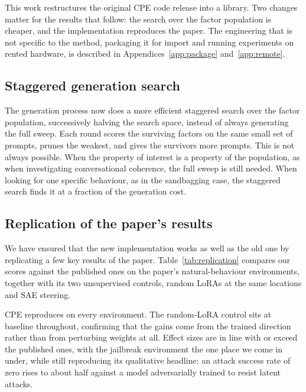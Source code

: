 This work restructures the original CPE code release \citep{mack2026} into a library.
Two changes matter for the results that follow: the search over the factor population is cheaper, and the implementation reproduces the paper.
The engineering that is not specific to the method, packaging it for import and running experiments on rented hardware, is described in Appendices~\ref{app:package} and~\ref{app:remote}.

\subsection{Staggered generation search}

The generation process now does a more efficient staggered search over the factor population, successively halving the search space, instead of always generating the full sweep.
Each round scores the surviving factors on the same small set of prompts, prunes the weakest, and gives the survivors more prompts.
This is not always possible.
When the property of interest is a property of the population, as when investigating conversational coherence, the full sweep is still needed.
When looking for one specific behaviour, as in the sandbagging case, the staggered search finds it at a fraction of the generation cost.

\subsection{Replication of the paper's results}

We have ensured that the new implementation works as well as the old one by replicating a few key results of the paper.
Table~\ref{tab:replication} compares our scores against the published ones on the paper's natural-behaviour environments, together with its two unsupervised controls, random LoRAs at the same locations and SAE steering.

\begin{table}[htbp]
  \centering
  \small
  
  \caption{%
    Replication of the CPE paper's Table~1.
    Each cell gives our score with the published value in parentheses.
    Scores are the selected top-1 factor's held-out test score; base is the same run's no-adapter baseline.
    Countdown and sycophancy are accuracies, jailbreak is attack success rate.%
  }
  \label{tab:replication}
\end{table}

CPE reproduces on every environment.
The random-LoRA control sits at baseline throughout, confirming that the gains come from the trained direction rather than from perturbing weights at all.
Effect sizes are in line with or exceed the published ones, with the jailbreak environment the one place we come in under, while still reproducing its qualitative headline: an attack success rate of zero rises to about half against a model adversarially trained to resist latent attacks.
